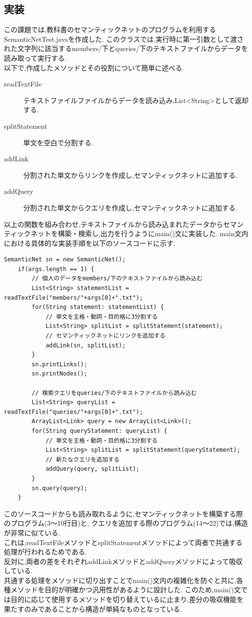 \documentclass[uplatex,12pt]{jsarticle}
\begin{document}
\newpage

\subsection{実装}
この課題では,教科書のセマンティックネットのプログラムを利用するSemanticNetTest.javaを作成した.
このクラスでは,実行時に第一引数として渡された文字列に該当するmembers/下とqueries/下のテキストファイルからデータを読み取って実行する. \\
以下で,作成したメソッドとその役割について簡単に述べる.
\begin{description}
    \item[readTextFile] テキストファイルファイルからデータを読み込み,List<String>として返却する.
    \item[splitStatement] 単文を空白で分割する.
    \item[addLink] 分割された単文からリンクを作成し,セマンティックネットに追加する.
    \item[addQuery] 分割された単文からクエリを作成し,セマンティックネットに追加する.
\end{description}
以上の関数を組み合わせ,テキストファイルから読み込まれたデータからセマンティックネットを構築・検索し,出力を行うようにmain()文に実装した.
main文内における具体的な実装手順を以下のソースコードに示す.
\begin{lstlisting}[caption=SemanticNetTest.javaのmain()内部, label=mid]
    SemanticNet sn = new SemanticNet();
    if(args.length == 1) {
        // 個人のデータをmembers/下のテキストファイルから読み込む
        List<String> statementList = readTextFile("members/"+args[0]+".txt");
        for(String statement: statementList) {
            // 単文を主格・動詞・目的格に3分割する
            List<String> splitList = splitStatement(statement);
            // セマンティックネットにリンクを追加する
            addLink(sn, splitList);
        }
        sn.printLinks();
        sn.printNodes();
        
        // 検索クエリをqueries/下のテキストファイルから読み込む
        List<String> queryList = readTextFile("queries/"+args[0]+".txt");
        ArrayList<Link> query = new ArrayList<Link>();
        for(String queryStatement: queryList) {
            // 単文を主格・動詞・目的格に3分割する
            List<String> splitList = splitStatement(queryStatement);
            // 新たなクエリを追加する
            addQuery(query, splitList);
        }
        sn.query(query);
    }
\end{lstlisting}
このソースコードからも読み取れるように,セマンティックネットを構築する際のプログラム(3〜10行目)と,
クエリを追加する際のプログラム(14〜22)では,構造が非常に似ている. \\
これは,readTextFileメソッドとsplitStatementメソッドによって両者で共通する処理が行われるためである. \\
反対に,両者の差をそれぞれaddLinkメソッドとaddQueryメソッドによって吸収している. \\
共通する処理をメソッドに切り出すことでmain()文内の複雑化を防ぐと共に,各種メソッドを目的が明確かつ汎用性があるように設計した.
このため,main()文では目的に応じて使用するメソッドを切り替えているに止まり,差分の吸収機能を果たすのみであることから構造が単純なものとなっている.
\end{document}
